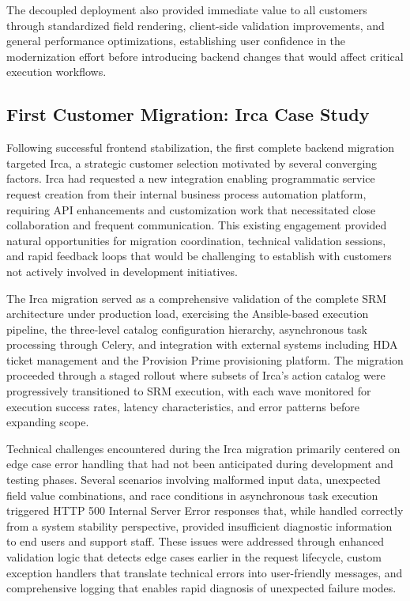 The decoupled deployment also provided immediate value to all customers through standardized field rendering, client-side validation improvements, and general performance optimizations, establishing user confidence in the modernization effort before introducing backend changes that would affect critical execution workflows.

\subsection{First Customer Migration: Irca Case Study}

Following successful frontend stabilization, the first complete backend migration targeted Irca, a strategic customer selection motivated by several converging factors. Irca had requested a new integration enabling programmatic service request creation from their internal business process automation platform, requiring API enhancements and customization work that necessitated close collaboration and frequent communication. This existing engagement provided natural opportunities for migration coordination, technical validation sessions, and rapid feedback loops that would be challenging to establish with customers not actively involved in development initiatives.

The Irca migration served as a comprehensive validation of the complete SRM architecture under production load, exercising the Ansible-based execution pipeline, the three-level catalog configuration hierarchy, asynchronous task processing through Celery, and integration with external systems including HDA ticket management and the Provision Prime provisioning platform. The migration proceeded through a staged rollout where subsets of Irca's action catalog were progressively transitioned to SRM execution, with each wave monitored for execution success rates, latency characteristics, and error patterns before expanding scope.

Technical challenges encountered during the Irca migration primarily centered on edge case error handling that had not been anticipated during development and testing phases. Several scenarios involving malformed input data, unexpected field value combinations, and race conditions in asynchronous task execution triggered HTTP 500 Internal Server Error responses that, while handled correctly from a system stability perspective, provided insufficient diagnostic information to end users and support staff. These issues were addressed through enhanced validation logic that detects edge cases earlier in the request lifecycle, custom exception handlers that translate technical errors into user-friendly messages, and comprehensive logging that enables rapid diagnosis of unexpected failure modes.
